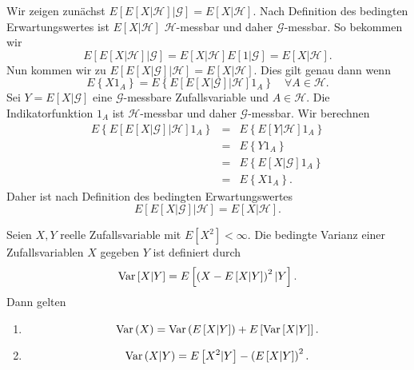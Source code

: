 \solution Wir zeigen zunächst 
$E\left[ E\left[ X | \mathcal H \right] | \mathcal G \right]=E \left[ X | \mathcal H \right]$.
Nach Definition des bedingten Erwartungswertes ist $E\left[ X| \mathcal H \right]$ 
$\mathcal H$-messbar und daher $\mathcal G$-messbar. So bekommen wir 
\begin{equation*}
	E\left[ E\left[ X | \mathcal H \right] | \mathcal G \right] =
	E\left[ X| \mathcal H \right] E\left[ 1|\mathcal G \right] = 
	E \left[ X | \mathcal H \right ].
\end{equation*}
Nun kommen wir zu 
$E\left[ E\left[ X | \mathcal G \right] | \mathcal H \right]=E \left[ X | \mathcal H \right]$.
Dies gilt genau dann wenn 
\begin{equation*}
	E\left\{ X 1_A \right\} 
	= E\left\{ E\left[ E\left[ X|\mathcal G \right]|\mathcal H \right] 1_A \right\}  
	\quad \forall A\in\mathcal H.
\end{equation*}
Sei $Y=E\left[ X|\mathcal G \right]$ eine $\mathcal G$-messbare Zufallsvariable und
$A\in\mathcal H$. Die Indikatorfunktion $1_A$ ist $\mathcal H$-messbar und daher
$\mathcal G$-messbar. Wir berechnen
\begin{eqnarray*}
	E\left\{ E\left[ E\left[ X|\mathcal G \right]|\mathcal H \right] 1_A \right\} &=& 
	E\left\{ E\left[ Y|\mathcal H \right] 1_A \right\} \\
	&=& E\left\{ Y 1_A \right\} \\
	&=& E\left\{ E\left[ X|\mathcal G \right] 1_A \right\} \\
    &=& E\left\{ X 1_A \right\}. 
\end{eqnarray*}
Daher ist nach Definition des bedingten Erwartungswertes
\begin{equation*}
    E\left[ E\left[ X | \mathcal G \right] | \mathcal H \right]=E \left[ X |
    \mathcal H \right].
\end{equation*}


 Seien $X,Y$ reelle Zufallsvariable mit $E\left[
X^2 \right] <\infty$.  Die bedingte Varianz einer Zufallsvariablen $X$ gegeben
$Y$ ist definiert durch
\begin{equation*}
	\operatorname{Var} \left[ X|Y \right] = E \left[ \left( X - E\left[ X|Y \right] \right)^2|Y \right].
\end{equation*}
Dann gelten
\begin{enumerate}
    \item 
        \begin{equation*}
        \operatorname{Var} \left( X \right) = 
        \operatorname{Var} \left( E\left[ X|Y \right] \right) + E \left[ \operatorname{Var}\left[ X|Y \right] \right].
        \end{equation*}
    \item \begin{equation*}
            \operatorname{Var} \left( X | Y \right) = E \left[ X^2 | Y \right] 
            - \left( E\left[ X | Y \right] \right)^2.
        \end{equation*}
\end{enumerate}

